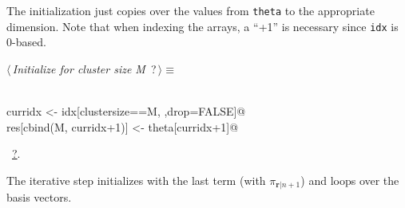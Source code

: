 \documentclass[reqno]{amsart}
\renewcommand{\NWtarget}[2]{\hypertarget{#1}{#2}}
\renewcommand{\NWlink}[2]{\hyperlink{#1}{#2}}
\newcommand{\rvec}{\mathbf{r}}
\begin{document}
The initialization just copies over the values from \texttt{theta} to the appropriate dimension. Note that when indexing
the arrays, a ``+1'' is necessary since \texttt{idx} is 0-based.
\begin{flushleft} \small
\begin{minipage}{\linewidth}\label{scrap25}\raggedright\small
\NWtarget{nuweb?}{} $\langle\,${\itshape Initialize for cluster size M}\nobreak\ {\footnotesize {?}}$\,\rangle\equiv$
\vspace{-1ex}
\begin{list}{}{} \item
\mbox{}\verb@@\\
\mbox{}\verb@  curridx <- idx[clustersize==M, ,drop=FALSE]@\\
\mbox{}\verb@  res[cbind(M, curridx+1)] <- theta[curridx+1]@\\
\mbox{}\verb@@{\NWsep}
\end{list}
\vspace{-1.5ex}
\footnotesize
\begin{list}{}{\setlength{\itemsep}{-\parsep}\setlength{\itemindent}{-\leftmargin}}
\item \NWtxtMacroRefIn\ \NWlink{nuweb?}{?}.

\item{}
\end{list}
\end{minipage}\vspace{4ex}
\end{flushleft}
The iterative step initializes with the last term (with $\pi_{\rvec|n+1}$) and loops over the basis vectors.
\end{document}
